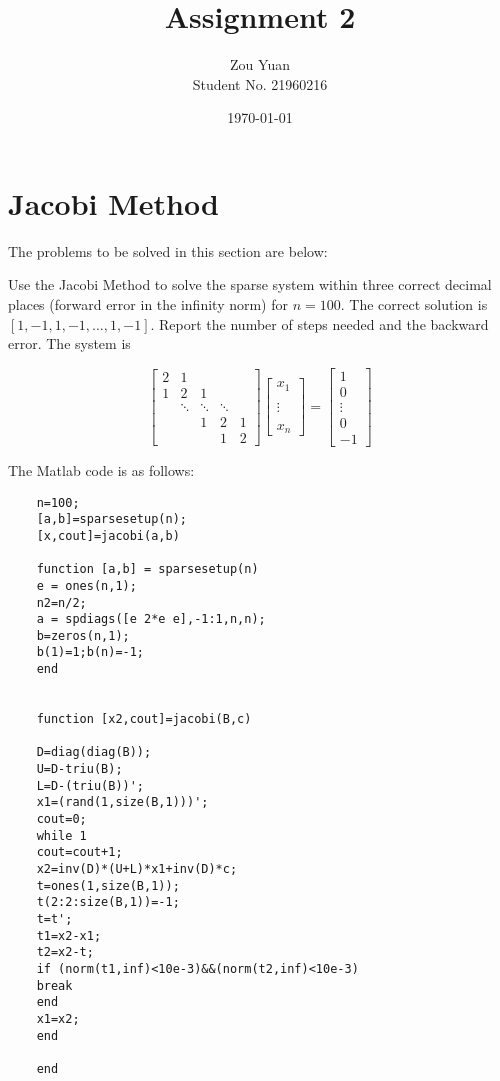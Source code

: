 \documentclass[UTF8]{ctexart}
\title{Assignment 2}  %
\author{Zou Yuan\\Student No. 21960216}   %
\date{\today}       %
\begin{document}
	\maketitle
	\section{Jacobi Method}
	The problems to be solved in this section are below:
	
	Use the Jacobi Method to solve the sparse system within three correct decimal places (forward
	error in the infinity norm) for $n = 100$. The correct solution is $[1,−1,1,−1, \dots ,1,−1]$. Report
	the number of steps needed and the backward error. The system is

	$$
	\begin{bmatrix} 
		2  &1 &    \\1 &2  &1&   \\&\ddots &\ddots&\ddots\\& &1  &2 &1\\ & & &1&2
	\end{bmatrix}\begin{bmatrix}x_1\\ \\\vdots\\ \\x_n\end{bmatrix}=\begin{bmatrix}
	1    \\0  \\\vdots  \\0\\-1
	\end{bmatrix}$$
	
	The Matlab code is as follows:
	
	\begin{centering}
	\begin{lstlisting}
	n=100;
	[a,b]=sparsesetup(n);
	[x,cout]=jacobi(a,b)
	
	function [a,b] = sparsesetup(n)
	e = ones(n,1);
	n2=n/2;
	a = spdiags([e 2*e e],-1:1,n,n);   
	b=zeros(n,1);                         
	b(1)=1;b(n)=-1;
	end
	
	
	function [x2,cout]=jacobi(B,c)
	
	D=diag(diag(B));
	U=D-triu(B);
	L=D-(triu(B))';
	x1=(rand(1,size(B,1)))';
	cout=0;
	while 1
	cout=cout+1;
	x2=inv(D)*(U+L)*x1+inv(D)*c;
	t=ones(1,size(B,1));
	t(2:2:size(B,1))=-1;
	t=t';
	t1=x2-x1;
	t2=x2-t;
	if (norm(t1,inf)<10e-3)&&(norm(t2,inf)<10e-3)
	break
	end
	x1=x2;
	end
	
	end
	\end{lstlisting}
		\end{centering}
	
\end{document}
